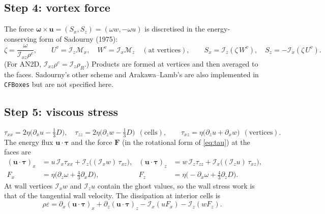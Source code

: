 \documentclass[11pt,a4paper]{article}
\newcommand{\bu}{\mathbf{u}}
\newcommand{\bF}{\mathbf{F}}
\newcommand{\btau}{\boldsymbol{\tau}}
\newcommand{\bomega}{\boldsymbol{\omega}}
\newcommand{\code}[1]{\texttt{#1}}
\newcommand{\Ix}{\mathcal{I}_x}
\newcommand{\Iz}{\mathcal{I}_z}
\newcommand{\Ixz}{\mathcal{I}_{xz}}
\begin{document}
\subsection{Step 4: vortex force}
The force $\bomega\times\bu=(S_x,S_z)=(\omega w,-\omega u)$ is discretised in the energy-conserving form of Sadourny (1975):
\begin{equation}
  \zeta=\frac{\omega}{\Ixz\rho^c},\qquad U^v=\Iz\mathcal M_x,\quad W^v=\Ix\mathcal M_z\quad(\text{at vertices}),\qquad
  S_x=\Iz(\zeta\,W^v),\quad S_z=-\Ix(\zeta\,U^v).
\end{equation}
(For AN2D, $\Ixz\rho^c=\Iz\rho_R$.) Products are formed at vertices and then averaged to the faces. Sadourny's other scheme and Arakawa--Lamb's are also implemented in \code{CFBoxes} but are not specified here.

\subsection{Step 5: viscous stress}
\begin{equation}
  \tau_{xx}=2\eta\big(\partial_xu-\tfrac13D\big),\quad\tau_{zz}=2\eta\big(\partial_zw-\tfrac13D\big)\ \ (\text{cells}),\qquad
  \tau_{xz}=\eta\big(\partial_zu+\partial_xw\big)\ \ (\text{vertices}).
\end{equation}
The energy flux $\bu\cdot\btau$ and the force $\bF$ (in the rotational form of \eqref{eq:tau}) at the faces are
\begin{align}
  (\bu\!\cdot\!\btau)_x&=u\,\Ix\tau_{xx}+\Iz\big((\Ix w)\,\tau_{xz}\big), &
  (\bu\!\cdot\!\btau)_z&=w\,\Iz\tau_{zz}+\Ix\big((\Iz u)\,\tau_{xz}\big),\\
  F_x&=\eta\big(\partial_z\omega+\tfrac43\partial_xD\big), &
  F_z&=\eta\big(-\partial_x\omega+\tfrac43\partial_zD\big).
\end{align}
At wall vertices $\Ix w$ and $\Iz u$ contain the ghost values, so the wall stress work is that of the tangential wall velocity.
The dissipation at interior cells is
\begin{equation}
  \rho\varepsilon=\partial_x(\bu\!\cdot\!\btau)_x+\partial_z(\bu\!\cdot\!\btau)_z-\Ix(uF_x)-\Iz(wF_z).
  \label{eq:rhoeps}
\end{equation}
\end{document}
